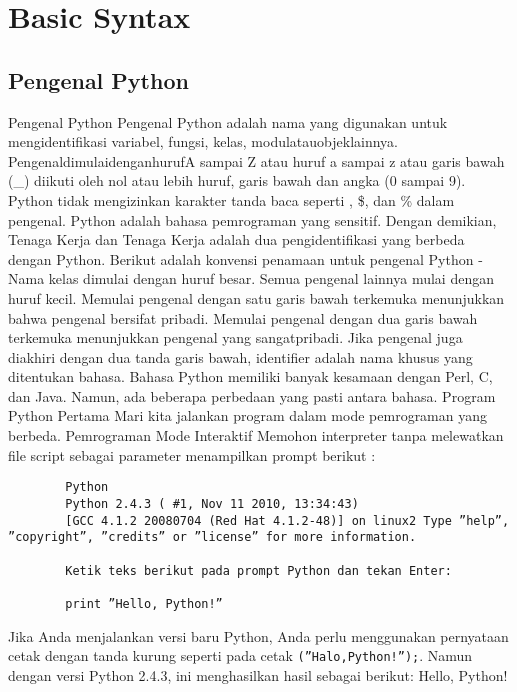 
\section{Basic Syntax}
\subsection{Pengenal Python}
Pengenal Python Pengenal Python adalah nama yang digunakan untuk mengidentiﬁkasi variabel, fungsi, kelas, modulatauobjeklainnya. PengenaldimulaidenganhurufA sampai Z atau huruf a sampai z atau garis bawah (\_) diikuti oleh nol atau lebih huruf, garis bawah dan angka (0 sampai 9). Python tidak mengizinkan karakter tanda baca seperti \@, \$, dan \% dalam pengenal. Python adalah bahasa pemrograman yang sensitif. Dengan demikian, Tenaga Kerja dan Tenaga Kerja adalah dua pengidentiﬁkasi yang berbeda dengan Python. Berikut adalah konvensi penamaan untuk pengenal Python - Nama kelas dimulai dengan huruf besar. Semua pengenal lainnya mulai dengan huruf kecil. Memulai pengenal dengan satu garis bawah terkemuka menunjukkan bahwa pengenal bersifat pribadi. Memulai pengenal dengan dua garis bawah terkemuka menunjukkan pengenal yang sangatpribadi. Jika pengenal juga diakhiri dengan dua tanda garis bawah, identiﬁer adalah nama khusus yang ditentukan bahasa. 
Bahasa Python memiliki banyak kesamaan dengan Perl, C, dan Java. Namun, ada beberapa perbedaan yang pasti antara bahasa. Program Python Pertama Mari kita jalankan program dalam mode pemrograman yang berbeda. Pemrograman Mode Interaktif Memohon interpreter tanpa melewatkan ﬁle script sebagai parameter menampilkan prompt berikut :
	\begin{verbatim}
		Python
		Python 2.4.3 ( #1, Nov 11 2010, 13:34:43) 
		[GCC 4.1.2 20080704 (Red Hat 4.1.2-48)] on linux2 Type ”help”, ”copyright”, ”credits” or ”license” for more information.

		Ketik teks berikut pada prompt Python dan tekan Enter:
		
		print ”Hello, Python!”
	\end{verbatim}

Jika Anda menjalankan versi baru Python, Anda perlu menggunakan pernyataan cetak dengan tanda kurung seperti pada cetak \verb|(”Halo,Python!”);|. Namun dengan versi Python 2.4.3, ini menghasilkan hasil sebagai berikut:
Hello, Python!

